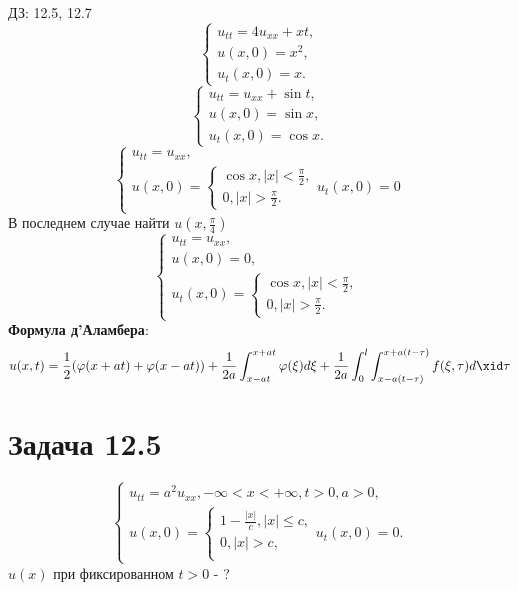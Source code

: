 \documentclass[11pt]{article}
\author{Sergey Makarov}
\date{\today}
\title{}
\def\zall{\setcounter{lem}{0}\setcounter{cnsqnc}{0}\setcounter{th}{0}\setcounter{Cmt}{0}\setcounter{equation}{0}}
\newcounter{lem}\setcounter{lem}{0}
\newcounter{th}\setcounter{th}{0}
\newcounter{cnsqnc}\setcounter{cnsqnc}{0}
\newcounter{Cmt}\setcounter{Cmt}{0}
\begin{document}
\zall

ДЗ: 12.5, 12.7
\begin{equation}
\begin{cases}
u_{tt} = 4u_{xx} + xt, \\
u(x, 0) = x^2, \\
u_t(x, 0) = x.
\end{cases}
\end{equation}
\begin{equation}
\begin{cases}
u_{tt} = u_{xx} + \sin t, \\
u(x, 0) = \sin x, \\
u_t(x, 0) = \cos x.
\end{cases}
\end{equation}
\begin{equation}
\begin{cases}
u_{tt} = u_{xx}, \\
u(x, 0) = \begin{cases}
\cos x, |x| < \frac{\pi}2, \\
0, |x| > \frac{\pi}2.
\end{cases}
u_t(x, 0) = 0
\end{cases}
\end{equation}
В последнем случае найти $u\left(x, \frac{\pi}4\right)$
\begin{equation}
\begin{cases}
u_{tt} = u_{xx}, \\
u(x, 0) = 0, \\
u_t(x, 0) = \begin{cases}
\cos x, |x| < \frac{\pi}2, \\
0, |x| > \frac{\pi}2.
\end{cases}
\end{cases}
\end{equation}
\textbf{Формула д'Аламбера}:
\begin{equation}
u(x, t) = \frac12(\varphi(x + at) + \varphi(x - at)) +
\frac1{2a}\int_{x - at}^{x + at}\varphi(\xi)d\xi +
\frac1{2a}\int_0^l\int_{x - a(t - \tau)}^{x + a(t - \tau)}f(\xi, \tau)d\xid\tau
\end{equation}
\section{Задача 12.5}
\label{sec:org5b7b3b7}
\begin{equation}
\begin{cases}
u_{tt} = a^2u_{xx}, -\infty < x < +\infty, t > 0, a > 0, \\
u(x, 0) = \begin{cases}
1 - \frac{|x|}c, |x| \leq c, \\
0, |x| > c, \\
\end{cases}
u_t(x, 0) = 0.
\end{cases}
\end{equation}
$u(x)$ при фиксированном $t > 0$ - ?
\end{document}

